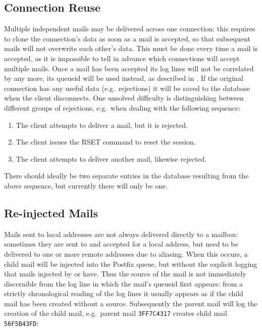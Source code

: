 \subsection{Connection Reuse}

\label{connection reuse}

Multiple independent mails may be delivered across one connection: this
requires \parsername{} to clone the connection's data as soon as a mail is
accepted, so that subsequent mails will not overwrite each other's data.
This must be done every time a mail is accepted, as it is impossible to
tell in advance which connections will accept multiple mails.  Once a mail
has been accepted its log lines will not be correlated by  any
more, its queueid will be used instead, as described in .  If the original connection has any useful data (e.g.\ rejections)
it will be saved to the database when the client disconnects.  One unsolved
difficulty is distinguishing between different groups of rejections, e.g.\
when dealing with the following sequence:

\begin{enumerate}

    \item The client attempts to deliver a mail, but it is rejected.

    \item The client issues the RSET command to reset the 
        session.

    \item The client attempts to deliver another mail, likewise rejected.

\end{enumerate}

There should ideally be two separate entries in the database resulting from
the above sequence, but currently there will only be one.



\subsection{Re-injected Mails}

\label{Re-injected mails}

\label{tracking re-injected mail}

Mails sent to local addresses are not always delivered directly to a
mailbox: sometimes they are sent to and accepted for a local address, but
need to be delivered to one or more remote addresses due to aliasing.  When
this occurs, a child mail will be injected into the Postfix queue, but
without the explicit logging that mails injected by \daemon{smtpd} or
\daemon{postdrop} have.  Thus the source of the mail is not immediately
discernible from the log line in which the mail's queueid first appears:
from a strictly chronological reading of the log lines it usually appears
as if the child mail has been created without a source.  Subsequently the
parent mail will log the creation of the child mail, e.g.\ parent mail
\texttt{3FF7C4317} creates child mail \texttt{56F5B43FD}\@:

